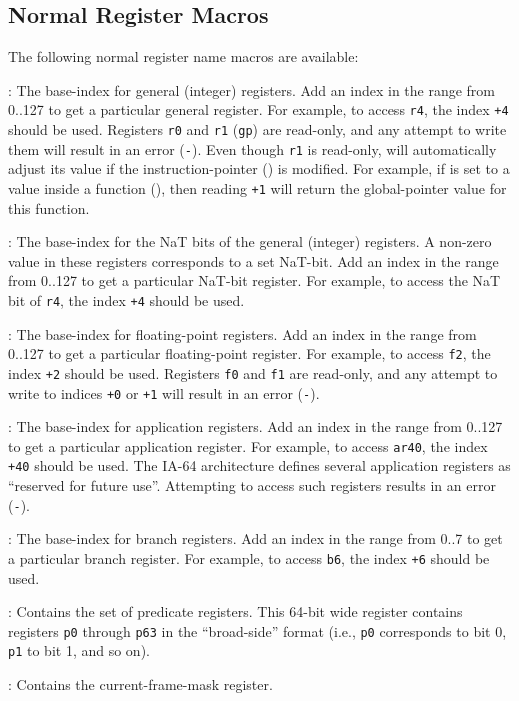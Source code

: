 \documentclass{article}
\begin{document}
\subsection{Normal Register Macros}

The following normal register name macros are available:
\begin{Description}
\item[\Const{UNW\_IA64\_GR}:] The base-index for general (integer)
  registers.  Add an index in the range from 0..127 to get a
  particular general register.  For example, to access \texttt{r4},
  the index \texttt{+4} should be used.
  Registers \texttt{r0} and \texttt{r1} (\texttt{gp}) are read-only,
  and any attempt to write them will result in an error
  (\texttt{-}).  Even though \texttt{r1} is
  read-only,  will automatically adjust its value if
  the instruction-pointer () is modified.  For
  example, if  is set to a value inside a
  function (), then reading
  \texttt{+1} will return the global-pointer
  value for this function.
\item[\Const{UNW\_IA64\_NAT}:] The base-index for the NaT bits of the
  general (integer) registers.  A non-zero value in these registers
  corresponds to a set NaT-bit.  Add an index in the range from 0..127
  to get a particular NaT-bit register.  For example, to access the
  NaT bit of \texttt{r4}, the index \texttt{+4}
  should be used.
\item[\Const{UNW\_IA64\_FR}:] The base-index for floating-point
  registers.  Add an index in the range from 0..127 to get a
  particular floating-point register.  For example, to access
  \texttt{f2}, the index \texttt{+2} should be
  used.  Registers \texttt{f0} and \texttt{f1} are read-only, and any
  attempt to write to indices \texttt{+0} or
  \texttt{+1} will result in an error
  (\texttt{-}).
\item[\Const{UNW\_IA64\_AR}:] The base-index for application
  registers.  Add an index in the range from 0..127 to get a
  particular application register.  For example, to access
  \texttt{ar40}, the index \texttt{+40} should be
  used.  The IA-64 architecture defines several application registers
  as ``reserved for future use''.  Attempting to access such registers
  results in an error (\texttt{-}).
\item[\Const{UNW\_IA64\_BR}:] The base-index for branch registers.
  Add an index in the range from 0..7 to get a particular branch
  register.  For example, to access \texttt{b6}, the index
  \texttt{+6} should be used.
\item[\Const{UNW\_IA64\_PR}:] Contains the set of predicate registers.
  This 64-bit wide register contains registers \texttt{p0} through
  \texttt{p63} in the ``broad-side'' format (i.e., \texttt{p0}
  corresponds to bit 0, \texttt{p1} to bit 1, and so on).
\item[\Const{UNW\_IA64\_CFM}:] Contains the current-frame-mask
  register.
\end{Description}
\end{document}
